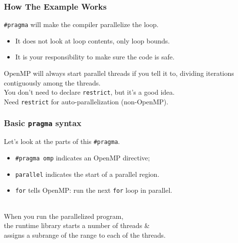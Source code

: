 \documentclass[aspectratio=43]{beamer}
\newenvironment{changemargin}[1]{%
  \begin{list}{}{%
    \setlength{\topsep}{0pt}%
    \setlength{\leftmargin}{#1}%
    \setlength{\rightmargin}{1em}
    \setlength{\listparindent}{\parindent}%
    \setlength{\itemindent}{\parindent}%
    \setlength{\parsep}{\parskip}%
  }%
  \item[]}{\end{list}}
\begin{document}
\begin{frame}[containsverbatim]
  \frametitle{How The Example Works}

\large
  \begin{changemargin}{1.5cm}
    \item \verb+#pragma+ will make the compiler parallelize the loop.

  \begin{itemize}
    \item It does not look at loop contents, only loop bounds.
    \item \alert{It is your responsibility to make sure the code is safe.}
  \end{itemize}
  \vfill
  OpenMP will always start parallel threads if you tell it to, dividing
  iterations contiguously among the threads.\\[1em]

  You don't need to declare {\tt restrict}, but it's a good idea.\\
  Need {\tt restrict} for auto-parallelization (non-OpenMP).
  \end{changemargin}

\end{frame}

\begin{frame}[containsverbatim]
  \frametitle{Basic {\tt pragma} syntax}

  \begin{changemargin}{2cm}
  Let's look at the parts of this \verb+#pragma+.\\[1em]

  \begin{itemize}
    \item \verb+#pragma omp+ indicates an OpenMP directive;
    \vfill
    \item {\tt parallel} indicates the start of a parallel region.
    \vfill
    \item {\tt for} tells OpenMP: run the next {\tt for} loop in parallel.
  \end{itemize}
  ~\\[1em]

  When you run the parallelized program, \\ the runtime library starts
  a number of threads \& \\  assigns a subrange of the range to 
  each of the threads.
  \end{changemargin}

\end{frame}
\end{document}
